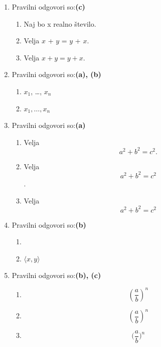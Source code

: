 \documentclass[11pt]{article}
\begin{document}
\begin{enumerate}
    \item Pravilni odgovori so:\textbf{(c)}%
    \begin{enumerate}
        \item Naj bo x realno število.
        \item Velja \(x\) + \(y\) = \(y\) + \(x\).
        \item Velja \(x + y = y + x\).
    \end{enumerate}

    \item Pravilni odgovori so:\textbf{(a), (b)}%
    \begin{enumerate}
        \item \(x_1\), \dots, \(x_n\)
        \item \(x_1, \ldots, x_n\)
    \end{enumerate}

    \item Pravilni odgovori so:\textbf{(a)}%
    \begin{enumerate}
        \item
Velja
\[
  a^2 + b^2 = c^2.
\]
        \item
Velja
\[
  a^2 + b^2 = c^2
\]
.
        \item
Velja
\[
  a^2 + b^2 = c^2
\]
    \end{enumerate}

    \item Pravilni odgovori so:\textbf{(b)}%
    \begin{enumerate}
        \item \(<x, y>\)
        \item \(\langle x, y \rangle\)
    \end{enumerate}

    \item Pravilni odgovori so:\textbf{(b), (c)}%
    \begin{enumerate}
        \item \[ (\frac{a}{b})^n \]
        \item \[ \left(\frac{a}{b}\right)^n \]
        \item \[ \Big(\frac{a}{b}\Big)^n \]
    \end{enumerate}


\end{enumerate}
\end{document}
